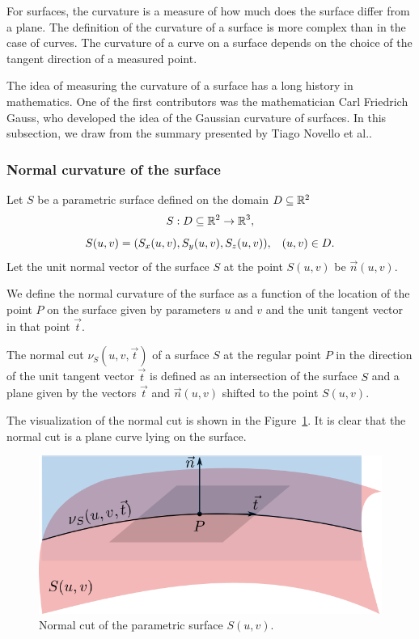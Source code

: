For surfaces, the curvature is a measure of how much does the surface differ from a 
plane. The definition of the curvature of a surface is more complex than in the case of curves. The curvature of a curve on a surface depends on the 
choice of the tangent direction of a measured point.

The idea of measuring the curvature of a surface has a long history in mathematics.
One of the first contributors was the mathematician Carl Friedrich Gauss, who developed
the idea of the Gaussian curvature of surfaces. In this subsection, we draw from
the summary presented by Tiago Novello et al.\cite{novello2021differential}.

\subsubsection*{Normal curvature of the surface}

Let $S$ be a parametric surface defined on the domain $D \subseteq \mathbb{R}^2$ 
$$S: D \subseteq \mathbb{R}^2 \to \mathbb{R}^3,$$ 
$$S(u, v) = (S_x(u,v), S_y(u,v), S_z(u,v)), \hspace{3mm} (u,v)\in D.$$
Let the unit normal vector of the surface $S$ at the point $S(u, v)$ be $\vec{n}(u, v)$.

We define the normal curvature of the surface as a function of the location of the point $P$
on the surface given by parameters $u$ and $v$ and the unit tangent vector in that point $\vec{t}$. 

\begin{definition}
The normal cut $\nu_S(u, v, \vec{t})$ of a surface $S$ at the regular point $P$ in the direction of the unit tangent vector 
$\vec{t}$ is defined as an intersection of the surface $S$ and a plane
given by the vectors $\vec{t}$ and $\vec{n}(u, v)$ shifted to 
the point $S(u, v)$. 
\end{definition}

The visualization of the normal cut is shown in the Figure~\ref{img:14}.
It is clear that the
normal cut is a plane curve lying on the surface.

\begin{figure}[h!]
    \centerline{\includegraphics[scale=0.5]{images/img14}}
    \caption[Normal cut]
    {Normal cut of the parametric surface $S(u,v)$.}
    \label{img:14}
\end{figure}

